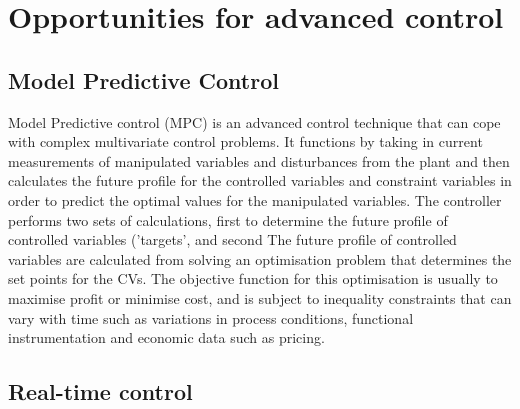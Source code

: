 \section{Opportunities for advanced control}

\subsection{Model Predictive Control}
Model Predictive control (MPC) is an advanced control technique that can cope with complex multivariate control problems. It functions by taking in current measurements of manipulated variables and disturbances from the plant and then calculates the future profile for the controlled variables and constraint variables in order to predict the optimal values for the manipulated variables. The controller performs two sets of calculations, first to determine the future profile of controlled variables ('targets', and second The future profile of controlled variables are calculated from solving an optimisation problem that determines the set points for the CVs. The objective function for this optimisation is usually to maximise profit or minimise cost, and is subject to inequality constraints that can vary with time such as variations in process conditions, functional instrumentation and economic data such as pricing. 

\subsection{Real-time control}